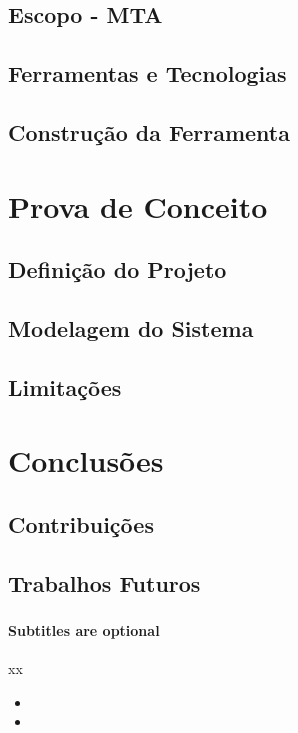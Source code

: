 \documentclass{beamer}
\begin{document}
\subsection[Escopo - MTA]{Escopo - MTA}

\subsection[Ferramentas e Tecnologias]{Ferramentas e Tecnologias}

\subsection[Construção da Ferramenta]{Construção da Ferramenta}

\section{Prova de Conceito}

\subsection[Definição do Projeto]{Definição do Projeto}

\subsection[Modelagem do Sistema]{Modelagem do Sistema}

\subsection[Limitações]{Limitações}

\section{Conclusões}

\subsection[Contribuições]{Contribuições}

\subsection[Trabalhos Futuros]{Trabalhos Futuros}

\begin{frame}
\frametitle{}
\framesubtitle{Subtitles are optional}

xx
\begin{itemize}
  \item
  \item
\end{itemize}
\end{frame}
\end{document}
